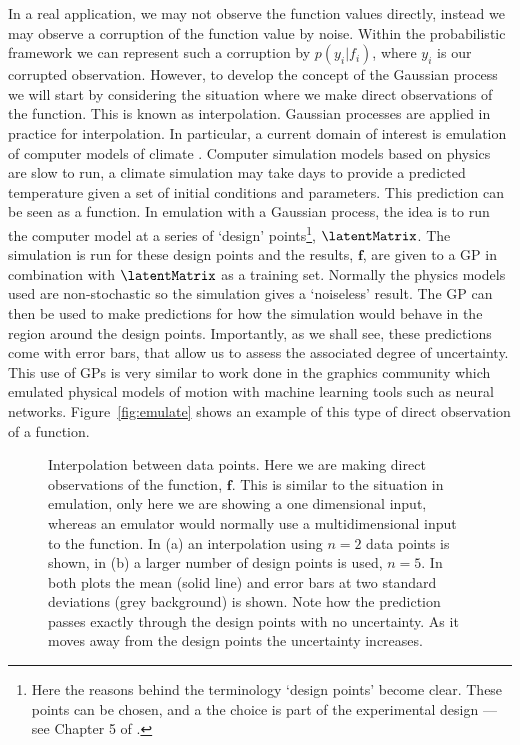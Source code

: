 In a real application, we may not observe the function values
directly, instead we may observe a corruption of the function value by
noise. Within the probabilistic framework we can represent such a
corruption by $p(y_i|f_i)$, where $y_i$ is our corrupted
observation. However, to develop the concept of the Gaussian process
we will start by considering the situation where we make direct
observations of the function. This is known as
interpolation.  Gaussian processes
are applied in practice for interpolation. In particular, a current
domain of interest is emulation of computer models of climate
\cite{Santer:design03,Challenor:towards06}. Computer simulation models
based on physics are slow to run, a climate simulation may take days
to provide a predicted temperature given a set of initial conditions
and parameters. This prediction can be seen as a function. In
emulation with a Gaussian process, the idea is to run the computer
model at a series of `design' points\footnote{Here the reasons
  behind the terminology `design points' become clear. These points
  can be chosen, and a the choice is part of the experimental design
  --- see Chapter 5 of \cite{Santer:design03}.}, $\latentMatrix$. The
simulation is run for these design points and the results,
$\mathbf{f}$, are given to a GP in combination with $\latentMatrix$ as a
training set. Normally the physics models used are non-stochastic so
the simulation gives a `noiseless' result. The GP can then be used
to make predictions for how the simulation would behave in the region
around the design points. Importantly, as we shall see, these
predictions come with error bars, that allow us to assess the
associated degree of uncertainty. This use of GPs is very similar to
work done in the graphics community  which emulated physical models of
motion with machine learning tools such as neural
networks. Figure~\ref{fig:emulate} shows an example of this type of
direct observation of a function.

\begin{figure}[htb]
  \hfill{}
\caption{Interpolation between data points. Here we are making direct
  observations of the function, $\mathbf{f}$. This is similar to the
  situation in emulation, only here we are showing a one dimensional
  input, whereas an emulator would normally use a multidimensional
  input to the function. In (a) an interpolation using $n=2$ data
  points is shown, in (b) a larger number of design points is used,
  $n=5$. In both plots the mean (solid line) and error bars at two
  standard deviations (grey background) is shown. Note how the
  prediction passes exactly through the design points with no
  uncertainty. As it moves away from the design points the uncertainty
  increases.}
\end{figure}

